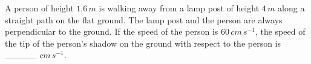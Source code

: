 \item A person of height \(1.6 \, m\) is walking away from a lamp post of height \(4 \, m\) along a straight path on the flat ground. The lamp post and the person are always perpendicular to the ground. If the speed of the person is \(60 \, cm \, s^{-1}\), the speed of the tip of the person's shadow on the ground with respect to the person is \_\_\_\_\_ \(cm \, s^{-1}\). 
